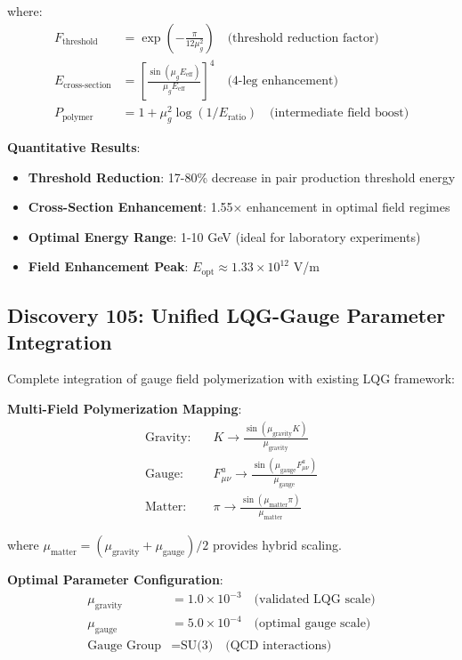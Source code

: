 \documentclass[11pt]{article}
\begin{document}
where:
\begin{align}
F_{\text{threshold}} &= \exp\left(-\frac{\pi}{12\mu_g^2}\right) \quad \text{(threshold reduction factor)} \\
E_{\text{cross-section}} &= \left[\frac{\sin(\mu_g E_{\text{eff}})}{\mu_g E_{\text{eff}}}\right]^4 \quad \text{(4-leg enhancement)} \\
P_{\text{polymer}} &= 1 + \mu_g^2 \log(1/E_{\text{ratio}}) \quad \text{(intermediate field boost)}
\end{align}

\textbf{Quantitative Results}:
\begin{itemize}
\item \textbf{Threshold Reduction}: 17-80\% decrease in pair production threshold energy
\item \textbf{Cross-Section Enhancement}: 1.55× enhancement in optimal field regimes  
\item \textbf{Optimal Energy Range}: 1-10 GeV (ideal for laboratory experiments)
\item \textbf{Field Enhancement Peak}: $E_{\text{opt}} \approx 1.33 \times 10^{12}$ V/m
\end{itemize}

\subsection{Discovery 105: Unified LQG-Gauge Parameter Integration}

Complete integration of gauge field polymerization with existing LQG framework:

\textbf{Multi-Field Polymerization Mapping}:
\begin{align}
\text{Gravity:} \quad &K \rightarrow \frac{\sin(\mu_{\text{gravity}} K)}{\mu_{\text{gravity}}} \\
\text{Gauge:} \quad &F^a_{\mu\nu} \rightarrow \frac{\sin(\mu_{\text{gauge}} F^a_{\mu\nu})}{\mu_{\text{gauge}}} \\
\text{Matter:} \quad &\pi \rightarrow \frac{\sin(\mu_{\text{matter}} \pi)}{\mu_{\text{matter}}}
\end{align}

where $\mu_{\text{matter}} = (\mu_{\text{gravity}} + \mu_{\text{gauge}})/2$ provides hybrid scaling.

\textbf{Optimal Parameter Configuration}:
\begin{align}
\mu_{\text{gravity}} &= 1.0 \times 10^{-3} \quad \text{(validated LQG scale)} \\
\mu_{\text{gauge}} &= 5.0 \times 10^{-4} \quad \text{(optimal gauge scale)} \\
\text{Gauge Group} &= \text{SU(3)} \quad \text{(QCD interactions)}
\end{align}
\end{document}
